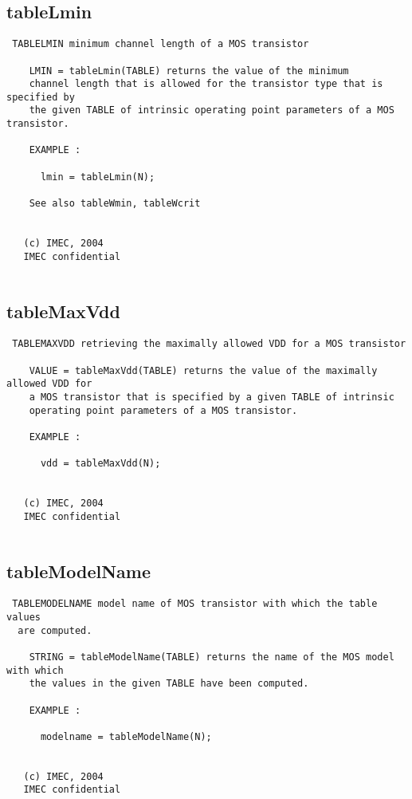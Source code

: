 \subsection{tableLmin}
\label{sec:tableLmin}
\begin{verbatim}
 TABLELMIN minimum channel length of a MOS transistor
 
    LMIN = tableLmin(TABLE) returns the value of the minimum
    channel length that is allowed for the transistor type that is specified by
    the given TABLE of intrinsic operating point parameters of a MOS transistor.
 
    EXAMPLE :
 
      lmin = tableLmin(N);
 
    See also tableWmin, tableWcrit
 
 
   (c) IMEC, 2004
   IMEC confidential 
 

\end{verbatim}

\newpage
\subsection{tableMaxVdd}
\label{sec:tableMaxVdd}
\begin{verbatim}
 TABLEMAXVDD retrieving the maximally allowed VDD for a MOS transistor
 
    VALUE = tableMaxVdd(TABLE) returns the value of the maximally allowed VDD for
    a MOS transistor that is specified by a given TABLE of intrinsic
    operating point parameters of a MOS transistor.
 
    EXAMPLE :
 
      vdd = tableMaxVdd(N);
 
 
   (c) IMEC, 2004
   IMEC confidential 
 

\end{verbatim}

\newpage
\subsection{tableModelName}
\label{sec:tableModelName}
\begin{verbatim}
 TABLEMODELNAME model name of MOS transistor with which the table values 
  are computed.
 
    STRING = tableModelName(TABLE) returns the name of the MOS model with which
    the values in the given TABLE have been computed.
 
    EXAMPLE :
 
      modelname = tableModelName(N);
 
 
   (c) IMEC, 2004
   IMEC confidential 
 

\end{verbatim}


